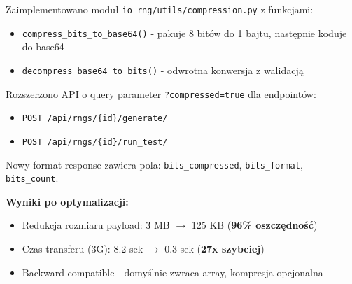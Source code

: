 \documentclass[12pt,a4paper]{article}
\begin{document}
\begin{tcolorbox}[colback=violet!5!white,colframe=violet!75!black,title=Optymalizacja Backendu - Priorytet:      
  WYSOKI]
  Zaimplementowano moduł \texttt{io\_rng/utils/compression.py} z funkcjami:                                        
  \begin{itemize}[itemsep=0pt]                                                                                     
      \item \texttt{compress\_bits\_to\_base64()} - pakuje 8 bitów do 1 bajtu, następnie koduje do base64          
      \item \texttt{decompress\_base64\_to\_bits()} - odwrotna konwersja z walidacją                               
  \end{itemize}                                                                                                    
                                                                                                                   
  Rozszerzono API o query parameter \texttt{?compressed=true} dla endpointów:                                      
  \begin{itemize}[itemsep=0pt]                                                                                     
      \item \texttt{POST /api/rngs/\{id\}/generate/}                                                               
      \item \texttt{POST /api/rngs/\{id\}/run\_test/}                                                              
  \end{itemize}                                                                                                    
                                                                                                                   
  Nowy format response zawiera pola: \texttt{bits\_compressed}, \texttt{bits\_format}, \texttt{bits\_count}.                                                                                                    
                                                                                                                   
  \textbf{Wyniki po optymalizacji:}                                                                                
  \begin{itemize}[itemsep=0pt]                                                                                     
      \item Redukcja rozmiaru payload: 3 MB $\rightarrow$ 125 KB (\textbf{96\% oszczędność})                       
      \item Czas transferu (3G): 8.2 sek $\rightarrow$ 0.3 sek (\textbf{27x szybciej})                             
      \item Backward compatible - domyślnie zwraca array, kompresja opcjonalna                                     
  \end{itemize}                                                                                     
  \end{tcolorbox}                                                                                                  
\end{document}
